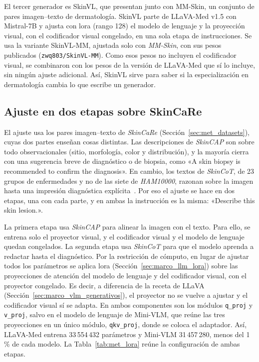 El tercer generador es SkinVL, que \textcite{zeng2025mmskin} presentan junto con MM-Skin, un conjunto de pares imagen--texto de dermatología.
SkinVL parte de LLaVA-Med v1.5 con Mistral-7B y ajusta con \gls{lora} (rango 128) el modelo de lenguaje y la
proyección visual, con el codificador visual congelado, en una sola etapa de instrucciones. Se usa la variante
SkinVL-MM, ajustada solo con \emph{MM-Skin}, con sus pesos publicados (\texttt{zwq803/SkinVL-MM}). Como esos pesos
no incluyen el codificador visual, se combinaron con los pesos de la versión de LLaVA-Med que sí lo incluye, sin ningún ajuste
adicional. Así, SkinVL sirve para saber si la especialización en dermatología cambia lo que escribe un generador.

\subsection{Ajuste en dos etapas sobre SkinCaRe}

El ajuste usa los pares imagen--texto de \emph{SkinCaRe} (Sección~\ref{sec:met_datasets}), cuyas dos partes enseñan
cosas distintas. Las descripciones de \emph{SkinCAP} son sobre todo observacionales (sitio, morfología, color y distribución), y la
mayoría cierra con una sugerencia breve de diagnóstico o de biopsia, como «A skin biopsy is recommended to confirm the
diagnosis». En cambio, los textos de \emph{SkinCoT}, de 23 grupos de enfermedades y no de las siete de
\emph{HAM10000}, razonan sobre la imagen hasta una impresión diagnóstica explícita~\cite{shen2025skincare}. Por eso el ajuste se hace en dos etapas, una con cada parte, y en ambas
la instrucción es la misma: «Describe this skin lesion.».

La primera etapa usa \emph{SkinCAP} para alinear la imagen con el texto. Para ello, se entrena solo el proyector visual, y el codificador visual
y el modelo de lenguaje quedan congelados. La segunda etapa usa \emph{SkinCoT} para que el modelo aprenda a redactar hasta el
diagnóstico. Por la restricción de cómputo, en lugar de ajustar todos los parámetros se aplica \gls{lora}
(Sección~\ref{sec:marco_llm_lora}) sobre las proyecciones de atención del modelo de lenguaje y del codificador visual,
con el proyector congelado. Es decir, a diferencia de la receta de LLaVA
(Sección~\ref{sec:marco_vlm_generativos}), el proyector no se vuelve a ajustar y el codificador visual sí se adapta.
En ambos componentes son los módulos \texttt{q\_proj} y \texttt{v\_proj}, salvo en el modelo
de lenguaje de Mini-VLM, que reúne las tres proyecciones en un único módulo, \texttt{qkv\_proj}, donde se coloca el
adaptador. Así,
LLaVA-Med entrena 33\,554\,432 parámetros y Mini-VLM 31\,457\,280, menos del 1\,\% de cada modelo. La
Tabla~\ref{tab:met_lora} reúne la configuración de ambas etapas.

